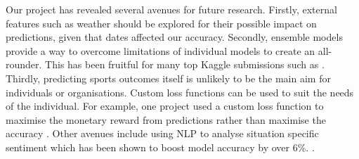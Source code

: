 \documentclass{article}
\begin{document}
Our project has revealed several avenues for future research. Firstly, external features such as weather should be explored for their possible impact on predictions, given that dates affected our accuracy. Secondly, ensemble models provide a way to overcome limitations of individual models to create an all-rounder. This has been fruitful for many top Kaggle submissions such as \cite{lumedium35}. Thirdly, predicting sports outcomes itself is unlikely to be the main aim for individuals or organisations. Custom loss functions can be used to suit the needs of the individual. For example, one project used a custom loss function to maximise the monetary reward from predictions rather than maximise the accuracy \cite{malafossemediumnotclassification}. Other avenues include using NLP to analyse situation specific sentiment which has been shown to boost model accuracy by over 6\%. \cite{beal2021combining}.


{\footnotesize
}
\end{document}
